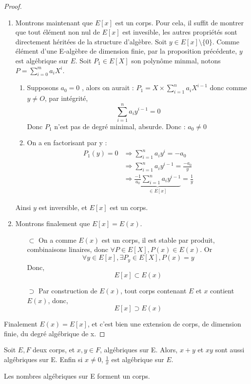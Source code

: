 \documentclass[a4paper,12pt,french]{report}
\begin{document}
\begin{proof}
\begin{enumerate}
		\item Montrons maintenant que $E[x]$ est un corps. Pour cela, il suffit de montrer que tout élément non nul de  $E[x]$ est invesible, les autres propriétés sont directement héritées de la structure d'algèbre.
			Soit $y \in E[x]\setminus\{0\} $. Comme élément d'une E-algèbre de dimension finie, par la proposition précédente, $y$ est algébrique sur $E$. Soit \(P_{1} \in E[X]\) son polynôme minmal, notons \(P = \sum_{i=0}^{m}a_{i}X^{i}\).{}
			\begin{enumerate}
				\item Supposons $a_{0} = 0$ , alors on aurait : $P_{1} = X\times\sum_{i=1}^{n}a_{i}X^{i-1}$ donc comme $y \neq O$, par intégrité,
				\[{}
					\sum_{i=1}^{n}a_{i}y^{i-1} = 0
				\]
				Donc $P_{1}$ n'est pas de degré minimal, absurde. Donc : $a_{0} \neq 0 $
			
				\item On a en factorisant par y :
				\[{}
					\begin{aligned}
						P_{1}(y) = 0 &\Rightarrow \sum_{i=1}^{n}a_{i}y^{i} = -a_{0}\\
									&\Rightarrow \sum_{i=1}^{n}a_{i}y^{i-1} = \frac{-a_{0}}{y}\\
									&\Rightarrow \underbrace{\frac{-1}{a_{0}}\sum_{i=1}^{n}a_{i}y^{i-1}}_{\in E[x]} = \frac{1}{y}
					\end{aligned}
				\]
			\end{enumerate}
			Ainsi $y$ est inversible, et $E[x]$ est un corps.
			
		\item Montrons finalement que $E[x] = E(x)$. 
			\begin{enumerate}
				\item[\(\subset\)] On a comme $E(x)$ est un corps, il est stable par produit, combinaisons linaires, donc \(\forall P \in E[X], P(x) \in E(x)\). Or \[ \forall y \in E[x], \exists P_{y} \in E[X], P(x) = y \] Donc,  \[E[x] \subset E(x)\]
				\item[\(\supset\)] 
				Par construction de $E(x)$, tout corps contenant $E$ et $x$ contient \(E(x)\), donc, 
				\[ E[x] \supset E(x) \]
			\end{enumerate}
	\end{enumerate}
	Finalement \(E(x) = E[x]\), et c'est bien une extension de corps, de dimension finie, du degré algébrique de x.
				\end{proof}
				
		
		\begin{proposition}
			Soit $E,F$ deux corps, et $x,y \in F$, algébriques sur E. Alors, 
			$x+y$ et $xy$ sont aussi algébriques sur E. Enfin si $x\neq0$, $\frac{1}{x}$ est algébrique sur $E$. 
		\end{proposition}
		
		\begin{proposition}
			Les nombres algébriques sur E forment un corps.
		\end{proposition}
		
\end{document}
